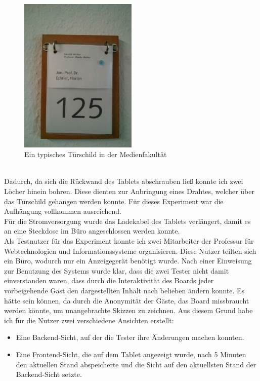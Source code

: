 \begin{figure}[h!]
  \centering
    \includegraphics[width=0.5\textwidth]{./img/Tuerschild.jpg}
  \caption{Ein typisches Türschild in der Medienfakultät}
  \label{img:tuerschild}
\end{figure}\\
Dadurch, da sich die Rückwand des Tablets abschrauben ließ konnte ich zwei Löcher hinein bohren. Diese dienten zur Anbringung eines Drahtes, welcher über das Türschild gehangen werden konnte. Für dieses Experiment war die Aufhängung vollkommen ausreichend.\\
Für die Stromversorgung wurde das Ladekabel des Tablets verlängert, damit es an eine Steckdose im Büro angeschlossen werden konnte.\\
Als Testnutzer für das Experiment konnte ich zwei Mitarbeiter der Professur für Webtechnologien und Informationssysteme organisieren.
Diese Nutzer teilten sich ein Büro, wodurch nur ein Anzeigegerät benötigt wurde. Nach einer Einweisung zur Benutzung des Systems wurde klar, dass die zwei Tester nicht damit einverstanden waren, dass durch die Interaktivität des Boards jeder vorbeigehende Gast den dargestellten Inhalt nach belieben ändern konnte. Es hätte sein können, da durch die Anonymität der Gäste, das Board missbraucht werden könnte, um unangebrachte Skizzen zu zeichnen.
Aus diesem Grund habe ich für die Nutzer zwei verschiedene Ansichten erstellt:
\begin{itemize}
  \item Eine Backend-Sicht, auf der die Tester ihre Änderungen machen konnten.
  \item Eine Frontend-Sicht, die auf dem Tablet angezeigt wurde, nach 5 Minuten den aktuellen Stand abspeicherte und die Sicht auf den aktuellsten Stand der Backend-Sicht setzte.
\end{itemize}
